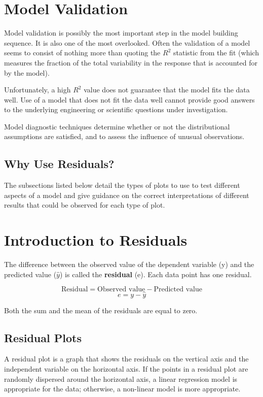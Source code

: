 ﻿
\section{Model Validation}
Model validation is possibly the most important step in the model building sequence. It is also one of the most overlooked. Often the validation of a model seems to consist of nothing more than quoting the $R^2$ statistic from the fit (which measures the fraction of the total variability in the response that is accounted for by the model). 

Unfortunately, a high $R^2$ value does not guarantee that the model fits the data well. Use of a model that does not fit the data well cannot provide good answers to the underlying engineering or scientific questions under investigation.



Model diagnostic techniques determine whether or not the distributional assumptions are satisfied, and to assess the influence of unusual observations.


\subsection{Why Use Residuals?}


The subsections listed below detail the types of plots to use to test different aspects of a model and give guidance on the correct interpretations of different results that could be observed for each type of plot.
\section{Introduction to Residuals}

The difference between the observed value of the dependent variable (y) and the predicted value ($\hat{y}$) is called the \textbf{residual} (e). Each data point has one residual.

\[\mbox{Residual} = \mbox{Observed value} - \mbox{Predicted value}\] 
\[e = y - \hat{y}\]

Both the sum and the mean of the residuals are equal to zero. 

\subsection{Residual Plots}
A residual plot is a graph that shows the residuals on the vertical axis and the independent variable on the horizontal axis. If the points in a residual plot are randomly dispersed around the horizontal axis, a linear regression model is appropriate for the data; otherwise, a non-linear model is more appropriate.

